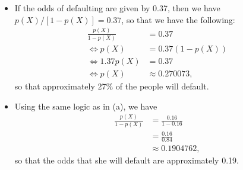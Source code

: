 \begin{itemize}
    \item[(a)] If the odds of defaulting are given by 0.37, then we have
        $p(X) / [1 - p(X)] = 0.37$, so that we have the following:
        \begin{equation*}
            \begin{split}
                \frac{p(X)}{1 - p(X)} &= 0.37 \\
                \Leftrightarrow p(X) &= 0.37(1 - p(X)) \\
                \Leftrightarrow 1.37p(X) &= 0.37 \\
                \Leftrightarrow p(X) &\approx 0.270073,
            \end{split}
        \end{equation*}
        so that approximately 27\% of the people will default.
    \item[(b)] Using the same logic as in (a), we have
        \begin{equation*}
            \begin{split}
                \frac{p(X)}{1 - p(X)} &= \frac{0.16}{1 - 0.16} \\
                &= \frac{0.16}{0.84} \\
                &\approx 0.1904762,
            \end{split}
        \end{equation*}
        so that the odds that she will default are approximately 0.19.
\end{itemize}
